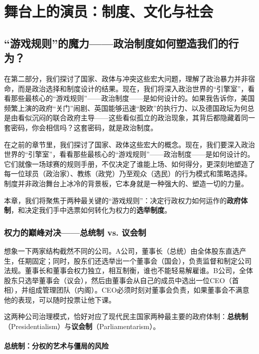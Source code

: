 \documentclass[a5paper, 11pt, openany]{ctexbook}
\begin{document}
\part{舞台上的演员：制度、文化与社会}

\chapter{“游戏规则”的魔力——政治制度如何塑造我们的行为？}

在第二部分，我们探讨了国家、政体与冲突这些宏大问题，理解了政治暴力并非宿命，而是政治选择和制度设计的结果。现在，我们将深入政治世界的“引擎室”，看看那些最核心的“游戏规则”——政治制度——是如何设计的。如果我告诉你，美国频繁上演的政府“关门”闹剧、英国能够迅速“脱欧”的执行力、以及德国政坛为何总是由看似沉闷的联合政府主导——这些看似孤立的政治现象，其背后都隐藏着同一套密码，你会相信吗？这套密码，就是政治制度。

在之前的章节里，我们探讨了国家、政体这些宏大的概念。现在，我们要深入政治世界的“引擎室”，看看那些最核心的“游戏规则”——政治制度——是如何设计的。它们就像一场球赛的规则手册，不仅决定了谁能上场、如何得分，更深刻地塑造了每一位球员（政治家）、教练（政党）乃至观众（选民）的行为模式和策略选择。制度并非政治舞台上冰冷的背景板，它本身就是一种强大的、塑造一切的力量。

本章，我们将聚焦于两种最关键的“游戏规则”：决定行政权力如何运作的\textbf{政府体制}，和决定我们手中选票如何转化为权力的\textbf{选举制度}。

\section{权力的巅峰对决——总统制 vs. 议会制}

想象一下两家结构截然不同的公司。A公司，董事长（总统）由全体股东直选产生，任期固定；同时，股东们还选举出一个董事会（国会），负责监督和制定公司法规。董事长和董事会权力独立，相互制衡，谁也不能轻易解雇谁。B公司，全体股东只选举董事会（议会），然后由董事会从自己的成员中选出一位CEO（首相），并组成管理团队（内阁）。CEO必须时刻对董事会负责，如果董事会不满意他的表现，可以随时投票让他下课。

这两种公司治理模式，恰好对应了现代民主国家两种最主要的政府体制：\textbf{总统制}（Presidentialism）与\textbf{议会制}（Parliamentarism）。

\subsection{总统制：分权的艺术与僵局的风险}
\end{document}
